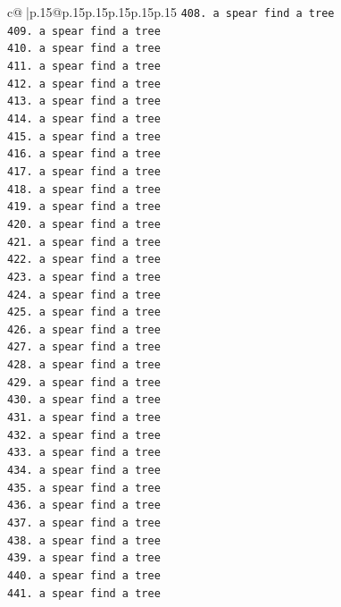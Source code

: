 \documentclass{article}
\begin{document}
{\begin{supertabular}{c@{$\;$}|p{.15\linewidth}@{}p{.15\linewidth}p{.15\linewidth}p{.15\linewidth}p{.15\linewidth}p{.15\linewidth}}
{{{\texttt{408. a spear find a tree} \\
\texttt{409. a spear find a tree} \\
\texttt{410. a spear find a tree} \\
\texttt{411. a spear find a tree} \\
\texttt{412. a spear find a tree} \\
\texttt{413. a spear find a tree} \\
\texttt{414. a spear find a tree} \\
\texttt{415. a spear find a tree} \\
\texttt{416. a spear find a tree} \\
\texttt{417. a spear find a tree} \\
\texttt{418. a spear find a tree} \\
\texttt{419. a spear find a tree} \\
\texttt{420. a spear find a tree} \\
\texttt{421. a spear find a tree} \\
\texttt{422. a spear find a tree} \\
\texttt{423. a spear find a tree} \\
\texttt{424. a spear find a tree} \\
\texttt{425. a spear find a tree} \\
\texttt{426. a spear find a tree} \\
\texttt{427. a spear find a tree} \\
\texttt{428. a spear find a tree} \\
\texttt{429. a spear find a tree} \\
\texttt{430. a spear find a tree} \\
\texttt{431. a spear find a tree} \\
\texttt{432. a spear find a tree} \\
\texttt{433. a spear find a tree} \\
\texttt{434. a spear find a tree} \\
\texttt{435. a spear find a tree} \\
\texttt{436. a spear find a tree} \\
\texttt{437. a spear find a tree} \\
\texttt{438. a spear find a tree} \\
\texttt{439. a spear find a tree} \\
\texttt{440. a spear find a tree} \\
\texttt{441. a spear find a tree} \\
}}}
\end{supertabular}}
\end{document}
